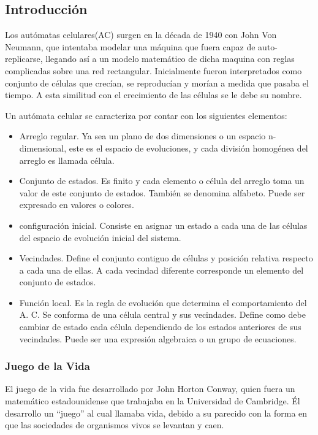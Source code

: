 \subsection{Introducción}
	Los autómatas celulares(AC) surgen en la década de 1940 con John Von Neumann, que intentaba modelar una máquina que fuera capaz de auto-replicarse, llegando así a un modelo matemático de dicha maquina con reglas complicadas sobre una red rectangular. Inicialmente fueron interpretados como conjunto de células que crecían, se reproducían y morían a medida que pasaba el tiempo. A esta similitud con el crecimiento de las células se le debe su nombre.\cite{PAGINA}

	Un autómata celular se caracteriza por contar con los siguientes elementos:
	\begin{itemize}
	 \item Arreglo regular. Ya sea un plano de dos dimensiones o un espacio n-dimensional, este es el espacio de evoluciones, y cada división homogénea del arreglo es llamada célula.
	 \item Conjunto de estados. Es finito y cada elemento o célula del arreglo toma un valor de este conjunto de estados. También se denomina alfabeto. Puede ser expresado en valores o colores.
	 \item configuración inicial. Consiste en asignar un estado a cada una de las células del espacio de evolución inicial del sistema.
	 \item Vecindades. Define el conjunto contiguo de células y posición relativa respecto a cada una de ellas. A cada vecindad diferente corresponde un elemento del conjunto de estados.
	 \item Función local. Es la regla de evolución que determina el comportamiento del A. C. Se conforma de una célula central y sus vecindades. Define como debe cambiar de estado cada célula dependiendo de los estados anteriores de sus vecindades. Puede ser una expresión algebraica o un grupo de ecuaciones.
	\end{itemize}

	\subsubsection{Juego de la Vida}
	El juego de la vida fue desarrollado por John Horton Conway, quien fuera un matemático estadounidense que trabajaba en la Universidad de Cambridge. Él desarrollo un ``juego'' al cual llamaba vida, debido a su parecido con la forma en que las sociedades de organismos vivos se levantan y caen.\cite{web}

